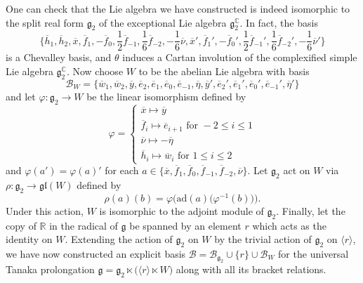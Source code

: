 \documentclass[11pt,letterpaper]{amsart}
\numberwithin{equation}{section}
\newcommand{\oline}{\overline}
\begin{document}
One can check that the Lie algebra we have constructed is indeed isomorphic to the split real form $\mathfrak g_2$ of the exceptional Lie algebra $\mathfrak{g}_2^\mathbb C$. In fact, the basis
\begin{equation}
    \Big\{\oline{h}_1,\oline{h}_2, \oline{x}, \oline{f}_1,-\oline{f}_0,\frac 12 \oline{f}_{-1}, \frac 16 \oline{f}_{-2}, -\frac16\oline{\nu}, \oline{x}',\oline{f}_1', -\oline{f}_0', \frac12\oline{f}_{-1}',\frac 16 \oline{f}_{-2}', -\frac16 \oline{\nu}'\Big\}
\end{equation}
is a Chevalley basis, and $\theta$ induces a Cartan involution of the complexified simple Lie algebra $\mathfrak{g}_2^\mathbb{C}$. Now choose $W$ to be the abelian Lie algebra with basis
\begin{equation}
    \mathcal{B}_W=\{\oline{w}_1,\oline{w}_2,\oline{y},\oline{e}_2,\oline{e}_1,\oline{e}_{0},\oline{e}_{-1},\oline{\eta}, \oline{y}',\oline{e}_2',\oline{e}_1',\oline{e}_{0}',\oline{e}_{-1}',\oline{\eta}'\}
\end{equation}
and let $\varphi:\mathfrak{g}_2\to W$ be the linear isomorphism defined by
\begin{equation}
    \varphi=\begin{cases}
        \oline{x}\mapsto \oline{y}
        \\
       \oline{f}_i\mapsto \oline{e}_{i+1}\text{ for }-2\leq i \leq 1
        \\
        \oline{\nu}\mapsto-\oline{\eta}
        \\
        \oline{h}_i\mapsto \oline{w}_i \text{ for }1\leq i \leq 2
    \end{cases}
\end{equation}
and $\varphi(a') = \varphi(a)'$ for each $a\in \{\oline{x},\oline{f}_1,\oline{f}_0,\oline{f}_{-1},\oline{f}_{-2},\oline{\nu}\}$. Let $\mathfrak{g}_2$ act on $W$ via $\rho:\mathfrak{g}_2\to \mathfrak{gl}(W)$ defined by
\begin{equation}
    \rho(a)(b) = \varphi\Big(\mathrm{ad}(a)\big(\varphi^{-1}(b)\big)\Big).
\end{equation}
Under this action, $W$ is isomorphic to the adjoint module of $\mathfrak{g}_2$. Finally, let the copy of $\mathbb{R}$ in the radical of $\mathfrak{g}$ be spanned by an element $r$ which acts as the identity on $W$. Extending the action of $\mathfrak{g}_2$ on $W$ by the trivial action of $\mathfrak{g_2}$ on $\langle r\rangle$, we have now constructed an explicit basis $\mathcal{B} = \mathcal{B}_{\mathfrak{g}_2}\cup\{r\}\cup\mathcal{B}_{W}$ for the universal Tanaka prolongation $\mathfrak{g} = \mathfrak{g}_2\ltimes\big(\langle r\rangle \ltimes W\big)$ along with all its bracket relations. 
\end{document}

